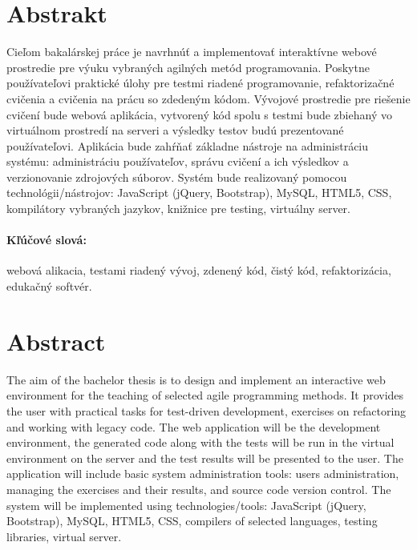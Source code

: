 \documentclass[12pt, oneside]{book}  %
\begin{document}
\newpage 
\section*{Abstrakt}


Cieľom bakalárskej práce je navrhnúť a implementovať interaktívne webové prostredie pre výuku vybraných agilných metód programovania. Poskytne používateľovi praktické úlohy pre testmi riadené programovanie, refaktorizačné cvičenia a cvičenia na prácu so zdedeným kódom. Vývojové prostredie pre riešenie cvičení bude webová aplikácia, vytvorený kód spolu s testmi bude zbiehaný vo virtuálnom prostredí na serveri a výsledky testov budú prezentované používateľovi. Aplikácia bude zahŕňať základne nástroje na administráciu systému: administráciu používateľov, správu cvičení a ich výsledkov a verzionovanie zdrojových súborov. Systém bude realizovaný pomocou technológii/nástrojov: JavaScript (jQuery, Bootstrap), MySQL, HTML5, CSS, kompilátory vybraných jazykov, knižnice pre testing, virtuálny server.

\paragraph*{Kľúčové slová:} webová alikacia, testami riadený vývoj, zdenený kód, čistý kód, refaktorizácia, edukačný softvér.


\newpage 
\section*{Abstract}

The aim of the bachelor thesis is to design and implement an interactive web environment for the teaching of selected agile programming methods. It provides the user with practical tasks for test-driven development, exercises on refactoring and working with legacy code. The web application will be the development environment, the generated code along with the tests will be run in the virtual environment on the server and the test results will be presented to the user. The application will include basic system administration tools: users administration, managing the exercises and their results, and source code version control. The system will be implemented using technologies/tools: JavaScript (jQuery, Bootstrap), MySQL, HTML5, CSS, compilers of selected languages, testing libraries, virtual server.
\end{document}
